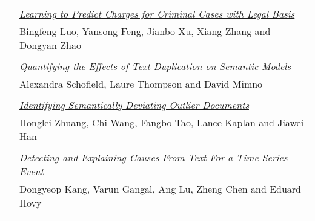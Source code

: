 \begin{tabular}{p{20mm}p{128mm}}
 & \hyperlink{page.2710}{\em Learning to Predict Charges for Criminal Cases with Legal Basis}\\
         & Bingfeng Luo, Yansong Feng, Jianbo Xu, Xiang Zhang and Dongyan Zhao \\
\\

 & \hyperlink{page.2720}{\em Quantifying the Effects of Text Duplication on Semantic Models}\\
         & Alexandra Schofield, Laure Thompson and David Mimno \\
\\

 & \hyperlink{page.2731}{\em Identifying Semantically Deviating Outlier Documents}\\
         & Honglei Zhuang, Chi Wang, Fangbo Tao, Lance Kaplan and Jiawei Han \\
\\

 & \hyperlink{page.2741}{\em Detecting and Explaining Causes From Text For a Time Series Event}\\
         & Dongyeop Kang, Varun Gangal, Ang Lu, Zheng Chen and Eduard Hovy \\
\\

\end{tabular}
\newpage
